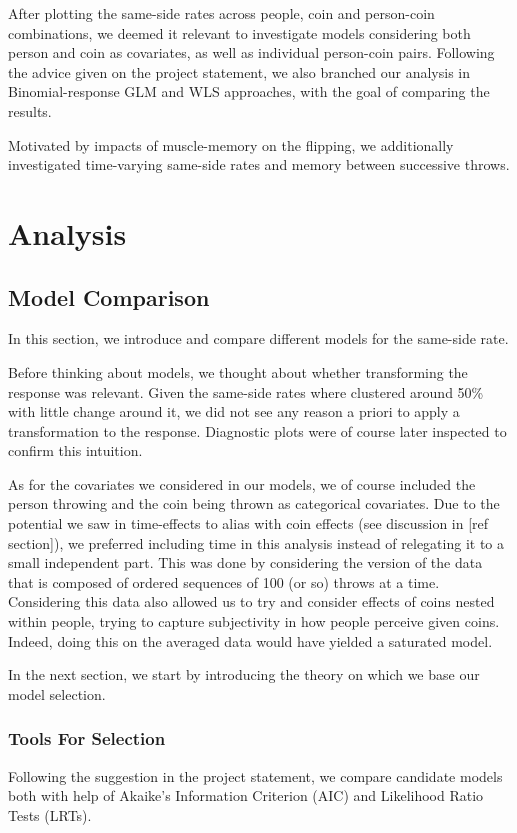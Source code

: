 \documentclass[a4paper, 12pt,oneside]{article}
\begin{document}
		After plotting the same-side rates across people, coin and person-coin combinations, we deemed it relevant to investigate models considering both person and coin as covariates, as well as individual person-coin pairs. Following the advice given on the project statement, we also branched our analysis in Binomial-response GLM and WLS approaches, with the goal of comparing the results. 

		Motivated by impacts of muscle-memory on the flipping, we additionally investigated time-varying same-side rates and memory between successive throws.
	\section{Analysis}
		\subsection{Model Comparison}
			In this section, we introduce and compare different models for the same-side rate. 

			Before thinking about models, we thought about whether transforming the response was relevant. Given the same-side rates where clustered around 50\% with little change around it, we did not see any reason a priori to apply a transformation to the response. Diagnostic plots were of course later inspected to confirm this intuition.
			
			As for the covariates we considered in our models, we of course included the person throwing and the coin being thrown as categorical covariates. Due to the potential we saw in time-effects to alias with coin effects (see discussion in [ref section]), we preferred including time in this analysis instead of relegating it to a small independent part. This was done by considering the version of the data that is composed of ordered sequences of 100 (or so) throws at a time. Considering this data also allowed us to try and consider effects of coins nested within people, trying to capture subjectivity in how people perceive given coins. Indeed, doing this on the averaged data would have yielded a saturated model. 

			In the next section, we start by introducing the theory on which we base our model selection. 
			\subsubsection{Tools For Selection}
				Following the suggestion in the project statement, we compare candidate models both with help of Akaike's Information Criterion (AIC) and Likelihood Ratio Tests (LRTs). 
\end{document}
